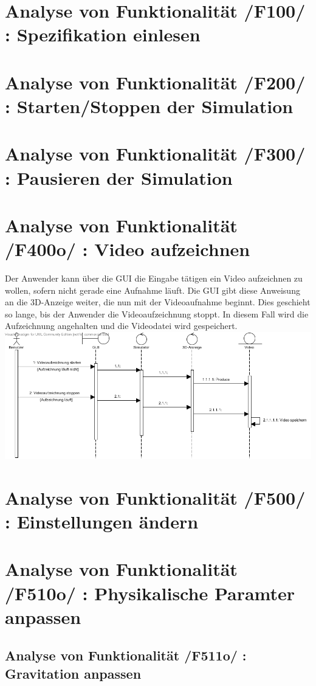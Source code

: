 \section{Analyse von Funktionalität /F100/ :  Spezifikation einlesen }
\section{Analyse von Funktionalität /F200/ :  Starten/Stoppen der Simulation}
\section{Analyse von Funktionalität /F300/ :  Pausieren der Simulation}
\section{Analyse von Funktionalität /F400o/ :  Video aufzeichnen}
Der Anwender kann über die GUI die Eingabe tätigen ein Video aufzeichnen zu wollen, sofern nicht gerade eine Aufnahme läuft. Die GUI gibt diese Anweisung an die 3D-Anzeige weiter, die nun mit der
Videoaufnahme beginnt. Dies geschieht so lange, bis der Anwender die Videoaufzeichnung stoppt. In diesem Fall wird die Aufzeichnung angehalten und die Videodatei wird gespeichert.
\includegraphics[width=16cm]{bilder/Video_aufzeichnen}
\section{Analyse von Funktionalität /F500/ :  Einstellungen ändern}
\section{Analyse von Funktionalität /F510o/ :  Physikalische Paramter anpassen}
\subsection{Analyse von Funktionalität /F511o/ :  Gravitation anpassen}
